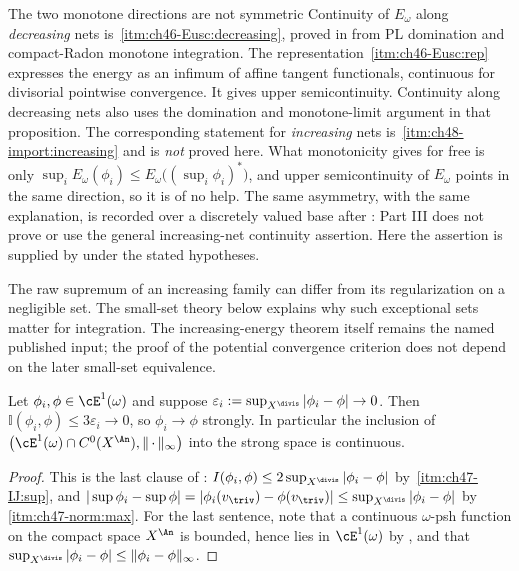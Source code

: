 \begin{warning}{The two monotone directions are not symmetric}
\label{warn:ch48-monotone-asymmetry}
Continuity of $E_\omega$ along \emph{decreasing} nets is
\,\cref{itm:ch46-Eusc:decreasing}, proved in
 from PL domination and compact-Radon monotone integration. The
representation
\,\cref{itm:ch46-Eusc:rep}
expresses the energy as an infimum of affine tangent functionals,
continuous for divisorial pointwise convergence. It gives upper
semicontinuity. Continuity along decreasing nets also uses the
domination and monotone-limit argument in that proposition.  The corresponding statement for
\emph{increasing} nets is
\,\cref{itm:ch48-import:increasing} and is
\emph{not} proved here.  What monotonicity gives for free is only
$\sup_iE_\omega(\phi_i)\le E_\omega\bigl((\sup_i\phi_i)^*\bigr)$, and
upper semicontinuity of $E_\omega$ points in the same direction, so it is
of no help.  The same asymmetry, with the same explanation, is recorded
over a discretely valued base after
: Part III does not prove or use the
general increasing-net continuity assertion. Here the assertion is
supplied by \cite[Theorem~12.5]{BJ22} under the stated hypotheses.

The raw supremum of an increasing family can differ from its
regularization on a negligible set. The small-set theory below explains
why such exceptional sets matter for integration. The increasing-energy
theorem itself remains the named published input; the proof of the
potential convergence criterion does not depend on the later
small-set equivalence.
\end{warning}

\begin{proposition}
\label{prop:ch48-uniform-strong}
Let $\phi_i,\phi\in\cE^1(\omega)$ and suppose
$\varepsilon_i:=\sup_{X^{\divis}}|\phi_i-\phi|\to0$.  Then
$\mathbb I(\phi_i,\phi)\le3\varepsilon_i\to0$, so $\phi_i\to\phi$
strongly.  In particular the inclusion of
$\bigl(\cE^1(\omega)\cap C^0(X^{\An}),\lVert\,\cdot\,\rVert_\infty\bigr)$
into the strong space is continuous.
\end{proposition}

\begin{proof}
This is the last clause of :
$I(\phi_i,\phi)\le2\sup_{X^{\divis}}|\phi_i-\phi|$ by
\,\cref{itm:ch47-IJ:sup}, and
$|\sup\phi_i-\sup\phi|=|\phi_i(v_{\triv})-\phi(v_{\triv})|
\le\sup_{X^{\divis}}|\phi_i-\phi|$ by
\,\cref{itm:ch47-norm:max}.  For the last
sentence, note that a continuous $\omega$-psh function on the compact space
$X^{\An}$ is bounded, hence lies in $\cE^1(\omega)$ by
, and that
$\sup_{X^{\divis}}|\phi_i-\phi|\le\lVert\phi_i-\phi\rVert_\infty$.
\end{proof}

